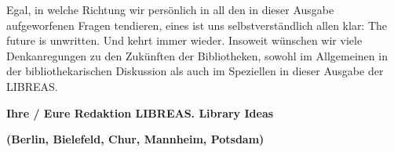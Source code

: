\documentclass[a4paper,
fontsize=11pt,
oneside,
numbers=noperiodatend,
parskip=half-,
bibliography=totoc,
final
]{scrartcl}
\begin{document}
Egal, in welche Richtung wir persönlich in all den in dieser Ausgabe
aufgeworfenen Fragen tendieren, eines ist uns selbstverständlich allen
klar: The future is unwritten. Und kehrt immer wieder. Insoweit wünschen
wir viele Denkanregungen zu den Zukünften der Bibliotheken, sowohl im
Allgemeinen in der bibliothekarischen Diskussion als auch im Speziellen
in dieser Ausgabe der LIBREAS.

\textbf{Ihre / Eure Redaktion LIBREAS. Library Ideas}

\textbf{(Berlin, Bielefeld, Chur, Mannheim, Potsdam)}
\end{document}
